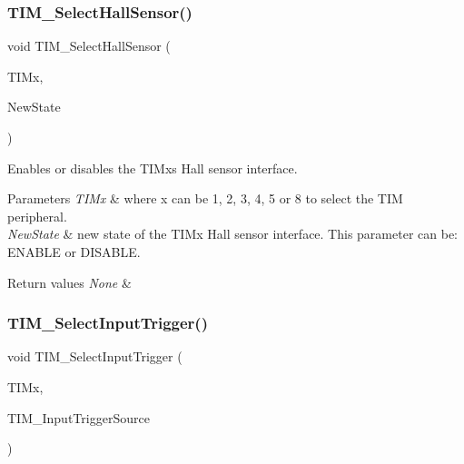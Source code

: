 \subsubsection{\texorpdfstring{TIM\_SelectHallSensor()}{TIM\_SelectHallSensor()}}
{\footnotesize\ttfamily void T\+I\+M\+\_\+\+Select\+Hall\+Sensor (\begin{DoxyParamCaption}\item[{\mbox{\hyperlink{struct_t_i_m___type_def}{T\+I\+M\+\_\+\+Type\+Def}} $\ast$}]{T\+I\+Mx,  }\item[{\mbox{\hyperlink{group___exported__types_gac9a7e9a35d2513ec15c3b537aaa4fba1}{Functional\+State}}}]{New\+State }\end{DoxyParamCaption})}



Enables or disables the T\+I\+Mx\textquotesingle{}s Hall sensor interface. 


\begin{DoxyParams}{Parameters}
{\em T\+I\+Mx} & where x can be 1, 2, 3, 4, 5 or 8 to select the T\+IM peripheral. \\
\hline
{\em New\+State} & new state of the T\+I\+Mx Hall sensor interface. This parameter can be\+: E\+N\+A\+B\+LE or D\+I\+S\+A\+B\+LE. \\
\hline
\end{DoxyParams}

\begin{DoxyRetVals}{Return values}
{\em None} & \\
\hline
\end{DoxyRetVals}
\mbox{\label{group___t_i_m___private___functions_ga4252583c6ae8a73d6fc66f7e951dbc35}} 
\subsubsection{\texorpdfstring{TIM\_SelectInputTrigger()}{TIM\_SelectInputTrigger()}}
{\footnotesize\ttfamily void T\+I\+M\+\_\+\+Select\+Input\+Trigger (\begin{DoxyParamCaption}\item[{\mbox{\hyperlink{struct_t_i_m___type_def}{T\+I\+M\+\_\+\+Type\+Def}} $\ast$}]{T\+I\+Mx,  }\item[{uint16\+\_\+t}]{T\+I\+M\+\_\+\+Input\+Trigger\+Source }\end{DoxyParamCaption})}



